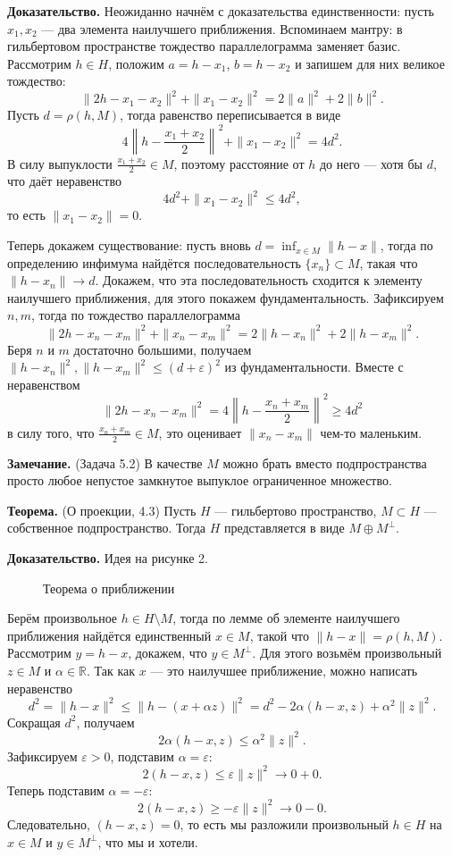 \textbf{Доказательство.} Неожиданно начнём с доказательства единственности: пусть $x_1, x_2$ --- два элемента наилучшего приближения.
Вспоминаем мантру: в гильбертовом пространстве тождество параллелограмма заменяет базис.
Рассмотрим $h \in H$, положим $a = h - x_1$, $b = h - x_2$ и запишем для них великое тождество:
\[
    \|2h - x_1 - x_2 \|^2 + \|x_1 - x_2\|^2 = 2\|a\|^2 + 2\|b\|^2.
\]
Пусть $d = \rho(h, M)$, тогда равенство переписывается в виде
\[
    4 \left\| h - \frac{x_1 + x_2}{2} \right\|^2 + \|x_1 - x_2\|^2 = 4d^2.
\]
В силу выпуклости $\frac{x_1 + x_2}{2} \in M$, поэтому расстояние от $h$ до него --- хотя бы $d$, что даёт неравенство
\[
    4d^2 + \|x_1 - x_2\|^2 \le 4d^2,
\]
то есть $\|x_1 - x_2\| = 0$.

Теперь докажем существование: пусть вновь $d = \inf_{x \in M} \|h - x\|$, тогда по определению инфимума найдётся последовательность $\{x_n\} \subset M$, такая что $\|h - x_n\| \to d$.
Докажем, что эта последовательность сходится к элементу наилучшего приближения, для этого покажем фундаментальность.
Зафиксируем $n, m$, тогда по тождество параллелограмма
\[
    \|2h - x_n - x_m\|^2 + \|x_n - x_m\|^2 = 2\|h - x_n\|^2 + 2\|h - x_m\|^2.
\]
Беря $n$ и $m$ достаточно большими, получаем $\|h - x_n\|^2, \|h - x_m\|^2 \le (d + \varepsilon)^2$ из фундаментальности.
Вместе с неравенством
\[
    \|2h - x_n - x_m\|^2 = 4 \left\| h - \frac{x_n + x_m}{2} \right\|^2 \ge 4d^2
\]
в силу того, что $\frac{x_n + x_m}{2} \in M$, это оценивает $\|x_n - x_m\|$ чем-то маленьким.

\QED

\textbf{Замечание.} (Задача 5.2) В качестве $M$ можно брать вместо подпространства просто любое непустое замкнутое выпуклое ограниченное множество.

\textbf{Теорема.} (О проекции, 4.3) Пусть $H$ --- гильбертово пространство, $M \subset H$ --- собственное подпространство.
Тогда $H$ представляется в виде $M \oplus M^\bot$.

\textbf{Доказательство.} Идея на рисунке 2.

\begin{figure}[ht]
    \centering
    \caption{Теорема о приближении}
\end{figure}

Берём произвольное $h \in H \setminus M$, тогда по лемме об элементе наилучшего приближения найдётся единственный $x \in M$, такой что $\|h - x\| = \rho(h, M)$.
Рассмотрим $y = h - x$, докажем, что $y \in M^\bot$.
Для этого возьмём произвольный $z \in M$ и $\alpha \in \mathbb R$.
Так как $x$ --- это наилучшее приближение, можно написать неравенство
\[
    d^2 = \|h - x\|^2 \le \|h - (x + \alpha z)\|^2 = d^2 - 2\alpha(h - x, z) + \alpha^2 \|z\|^2.
\]
Сокращая $d^2$, получаем
\[
    2\alpha (h - x, z) \le \alpha^2 \|z\|^2.
\]
Зафиксируем $\varepsilon > 0$, подставим $\alpha = \varepsilon$:
\[
    2(h - x, z) \le \varepsilon \|z\|^2 \to 0 + 0.
\]
Теперь подставим $\alpha = -\varepsilon$:
\[
    2(h - x, z) \ge -\varepsilon \|z\|^2 \to 0 - 0.
\]
Следовательно, $(h - x, z) = 0$, то есть мы разложили произвольный $h \in H$ на $x \in M$ и $y \in M^\bot$, что мы и хотели.

